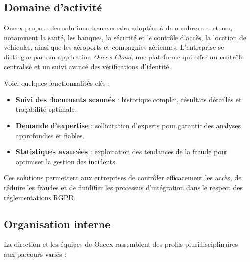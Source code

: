 \subsection{Domaine d'activité}

Oneex propose des solutions transversales adaptées à de nombreux secteurs, notamment la santé, les banques, la sécurité et le contrôle d’accès, la location de véhicules, ainsi que les aéroports et compagnies aériennes. L’entreprise se distingue par son application \emph{Oneex Cloud}, une plateforme qui offre un contrôle centralisé et un suivi avancé des vérifications d’identité. 

Voici quelques fonctionnalités clés :

\begin{itemize}
  \item \textbf{Suivi des documents scannés} : historique complet, résultats détaillés et traçabilité optimale.
  \item \textbf{Demande d’expertise} : sollicitation d’experts pour garantir des analyses approfondies et fiables.
  \item \textbf{Statistiques avancées} : exploitation des tendances de la fraude pour optimiser la gestion des incidents.
\end{itemize}

Ces solutions permettent aux entreprises de contrôler efficacement les accès, de réduire les fraudes et de fluidifier les processus d’intégration dans le respect des réglementations RGPD.

\subsection{Organisation interne}

La direction et les équipes de Oneex rassemblent des profils pluridisciplinaires aux parcours variés :

